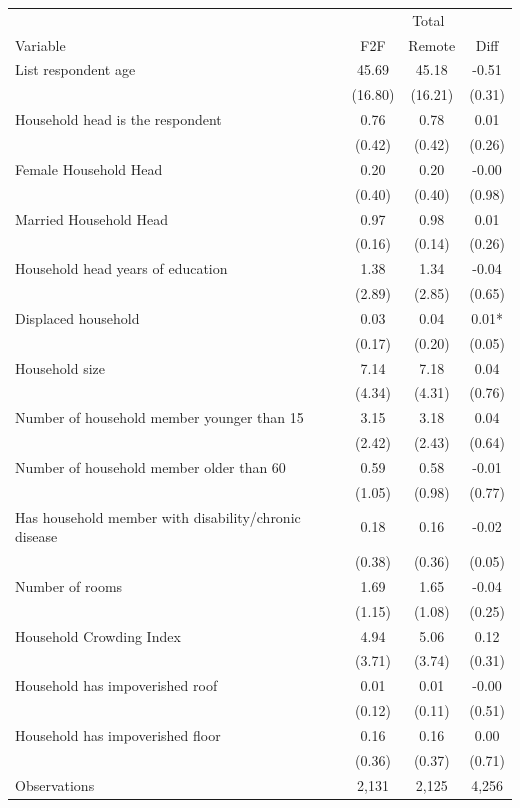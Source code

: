 \begin{tabular}{l*{3}c}
\hline\hline
 & \multicolumn{3}{c}{Total}\\ 
Variable & F2F & Remote & Diff \\
\hline
List respondent age&45.69&45.18&-0.51\\
&(16.80)&(16.21)&(0.31)\\
Household head is the respondent&0.76&0.78&0.01\\
&(0.42)&(0.42)&(0.26)\\
Female Household Head&0.20&0.20&-0.00\\
&(0.40)&(0.40)&(0.98)\\
Married Household Head&0.97&0.98&0.01\\
&(0.16)&(0.14)&(0.26)\\
Household head years of education&1.38&1.34&-0.04\\
&(2.89)&(2.85)&(0.65)\\
Displaced household&0.03&0.04&0.01*\\
&(0.17)&(0.20)&(0.05)\\
Household size&7.14&7.18&0.04\\
&(4.34)&(4.31)&(0.76)\\
Number of household member younger than 15&3.15&3.18&0.04\\
&(2.42)&(2.43)&(0.64)\\
Number of household member older than 60&0.59&0.58&-0.01\\
&(1.05)&(0.98)&(0.77)\\
Has household member with disability/chronic disease&0.18&0.16&-0.02\\
&(0.38)&(0.36)&(0.05)\\
Number of rooms&1.69&1.65&-0.04\\
&(1.15)&(1.08)&(0.25)\\
Household Crowding Index&4.94&5.06&0.12\\
&(3.71)&(3.74)&(0.31)\\
Household has impoverished roof&0.01&0.01&-0.00\\
&(0.12)&(0.11)&(0.51)\\
Household has impoverished floor&0.16&0.16&0.00\\
&(0.36)&(0.37)&(0.71)\\
\hline
Observations & 2,131 & 2,125 & 4,256 \\
\hline\hline
\end{tabular}
